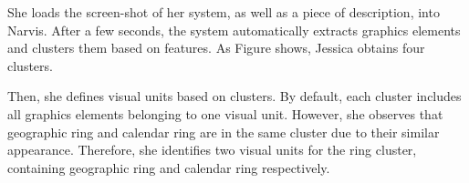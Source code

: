 
She loads the screen-shot of her system, as well as a piece of description, into Narvis.
After a few seconds, the system automatically extracts graphics elements and clusters them based on features. As Figure shows, Jessica obtains four clusters. 

Then, she defines visual units based on clusters. By default, each cluster includes all graphics elements belonging to one visual unit. However, she observes that geographic ring and calendar ring are in the same cluster due to their similar appearance. Therefore, she identifies two visual units for the ring cluster, containing geographic ring and calendar ring respectively.

